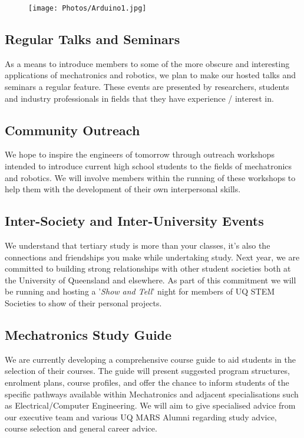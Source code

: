 \documentclass[a4paper,12pt]{report}
\begin{document}
\begin{figure}[H]
    \centering
    \texttt{[image: Photos/Arduino1.jpg]}
\end{figure}


\subsection*{Regular Talks and Seminars} 
As a means to introduce members to some of the more obscure and interesting applications of mechatronics and robotics, we plan to make our hosted talks and seminars a regular feature.
These events are presented by researchers, students and industry professionals in fields that they have experience / interest in.

\subsection*{Community Outreach}
We hope to inspire the engineers of tomorrow through outreach workshops intended to introduce current high school students to the fields of mechatronics and robotics.
We will involve members within the running of these workshops to help them with the development of their own interpersonal skills.

\subsection*{Inter-Society and Inter-University Events}
We understand that tertiary study is more than your classes, it's also the connections and friendships you make while undertaking study.
Next year, we are committed to building strong relationships with other student societies both at the University of Queensland and elsewhere.
As part of this commitment we will be running and hosting a '\textit{Show and Tell}' night for members of UQ STEM Societies to show of their personal projects.

\subsection*{Mechatronics Study Guide}
We are currently developing a comprehensive course guide to aid students in the selection of their courses.
The guide will present suggested program structures, enrolment plans, course profiles, and offer the chance to inform students of the specific pathways available within Mechatronics and adjacent specialisations such as Electrical/Computer Engineering.
We will aim to give specialised advice from our executive team and various UQ MARS Alumni regarding study advice, course selection and general career advice.
\end{document}
